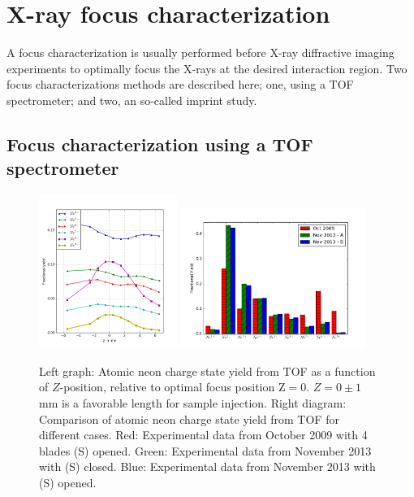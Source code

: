 \section{X-ray focus characterization}\label{sec:focus-characterization}
A focus characterization is usually performed before X-ray diffractive imaging experiments to optimally focus the X-rays at the desired interaction region. Two focus characterizations methods are described here; one, using a TOF spectrometer; and two, an so-called imprint study.
%
%
%
\subsection{Focus characterization using a TOF spectrometer}
%
\begin{figure}
	\centering
		\includegraphics[width=0.40\textwidth]{images/Focus-z-scan.png}
		\includegraphics[width=0.54\textwidth]{images/Focus-Fractional-Yield.png}
	\caption[Focal spot analysis using a time-of-flight ion spectrometer.]{Left graph: Atomic neon charge state yield from TOF as a function of $Z$-position, relative to optimal focus position $\text{Z}=0$. $Z=0\pm1$ mm is a favorable length for sample injection. Right diagram: Comparison of atomic neon charge state yield from TOF for different cases. Red: Experimental data from October 2009 with 4 blades (S) opened. Green: Experimental data from November 2013 with (S) closed. Blue: Experimental data from November 2013 with (S) opened.}
	\label{fig:Focus-z-scan}
\end{figure}
